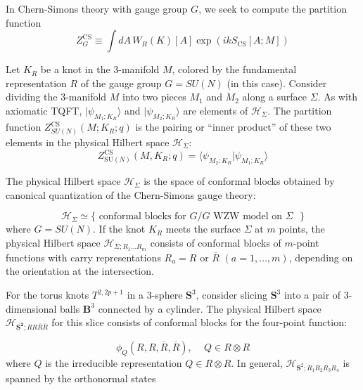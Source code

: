 \documentclass[a4paper,titlepage,twoside]{book}
\begin{document}
In Chern-Simons theory with gauge group $G$, we seek to compute the partition function
\begin{equation}
  Z_G^{\text{CS}} \equiv \int dA \, W_R{ (K)}[A] \exp{ \left( ik S_{\text{CS}}{ [A;M] } \right) }
\end{equation}



Let $K_R$ be a knot in the 3-manifold $M$, colored by the fundamental representation $R$ of the gauge group $G=SU(N)$ (in this case).  Consider dividing the 3-manifold $M$ into two pieces $M_1$ and $M_2$ along a surface $\Sigma$.  As with axiomatic TQFT, $|\psi_{M_1;K_R} \rangle$ and $|\psi_{M_2;K_R}\rangle$ are elements of $\mathcal{H}_{\Sigma}$.  The partition function $Z^{\text{CS}}_{ SU(N)}{ (M;K_R;q)}$ is the pairing or ``inner product'' of these two elements in the physical Hilbert space $\mathcal{H}_{\Sigma}$:
\begin{equation}
Z^{\text{CS}}_{ \text{SU}{(N)} }(M, K_R;q) = \langle \psi_{M_2;K_R} | \psi_{M_1;K_R} \rangle
\end{equation}

The physical Hilbert space $\mathcal{H}_{\Sigma}$ is the space of conformal blocks obtained by canonical quantization of the Chern-Simons gauge theory\cite{Witten1989}:

\[
\mathcal{H}_{\Sigma} \simeq \lbrace \text{ conformal blocks for $G/G$ WZW model on $\Sigma$ } \rbrace
\]
where $G = SU(N)$.  If the knot $K_R$ meets the surface $\Sigma$ at $m$ points, the physical Hilbert space $\mathcal{H}_{\Sigma; R_1 \dots R_m}$ consists of conformal blocks of $m$-point functions with carry representations $R_a = R$ or $\overline{R}$ $(a=1, \dots , m)$, depending on the orientation at the intersection.  

For the torus knots $T^{2,2p+1}$ in a 3-sphere $\mathbf{S}^3$, consider slicing $\mathbf{S}^3$ into a pair of 3-dimensional balls $\mathbf{B}^3$ connected by a cylinder.  The physical Hilbert space $\mathcal{H}_{ \mathbf{S^2}; R R \overline{R} \overline{R} }$ for this slice consists of conformal blocks for the four-point function:

\begin{equation}
  \phi_Q{ (R,R, \overline{R}, \overline{R})}, \quad \, Q \in R\otimes R
\end{equation}
where $Q$ is the irreducible representation $Q \in R\otimes R$.  In general, $\mathcal{H}_{\mathbf{S}^2; R_1R_2R_3R_4}$ is spanned by the orthonormal states
\end{document}
